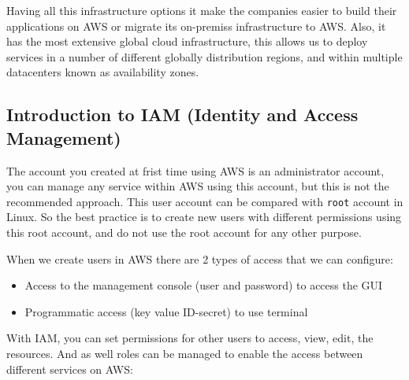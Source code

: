 \documentclass{article}
\begin{document}
Having all this infrastructure options it make the companies easier to build their applications on AWS or migrate its on-premiss infrastructure to AWS. Also, it has the most extensive global cloud infrastructure, this allows us to deploy services in a number of different globally distribution regions, and within multiple datacenters known as availability zones.

\subsection{Introduction to IAM (Identity and Access Management)}
The account you created at frist time using AWS is an administrator account, you can manage any service within AWS using this account, but this is not the recommended approach. This user account can be compared with \verb+root+ account in Linux. So the best practice is to create new users with different permissions using this root account, and do not use the root account for any other purpose.

When we create users in AWS there are 2 types of access that we can configure:

\begin{itemize}
    \item Access to the management console (user and password) to access the GUI
    \item Programmatic access (key value ID-secret) to use terminal
\end{itemize}

With IAM, you can set permissions for other users to access, view, edit, the resources. And as well roles can be managed to enable the access between different services on AWS:
\end{document}

